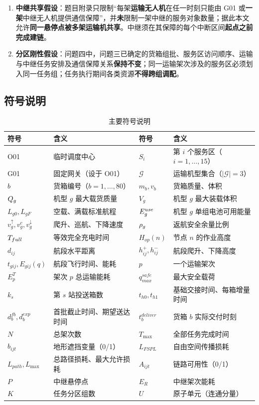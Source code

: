 \begin{enumerate}[label=\textbf{假设 \arabic*}]
	\item \textbf{中继共享假设}：题目附录只限制“每架\textbf{运输无人机}在任一时刻只能由 G01 或\textbf{一架}中继无人机提供通信保障”，并\textbf{未}限制一架中继的服务对象数量；据此本文允许\textbf{同一悬停点被多架运输机共享}。中继须在其保障的每个中断区间\textbf{起点之前完成建链}。
	\item \textbf{分区刚性假设}：问题四中，问题三已确定的货箱组批、服务区访问顺序、运输与中继任务安排及通信保障关系\textbf{保持不变}；同一运输架次涉及的服务区必须划入同一任务组；任务执行期间各类资源\textbf{不得跨组调配}。
\end{enumerate}

\subsection{符号说明}

\begin{table}[htbp]
	\caption{主要符号说明}
	\label{tab:symbol}
	\centering
	\begin{tabular}{llll}
		\toprule
		符号 & 含义 & 符号 & 含义 \\
		\midrule
		O01 & 临时调度中心 & $S_{i}$ & 第 $i$ 个服务区（$i=1,\dots,15$） \\
		G01 & 固定网关（设于 O01） & $\mathcal{G}$ & 运输机型集合（$|\mathcal{G}|=3$） \\
		$b$ & 货箱编号（$b=1,\dots,80$） & $m_{b},v_{b}$ & 货箱质量、体积 \\
		$Q_{g}$ & 机型 $g$ 最大载货质量 & $V_{g}$ & 机型 $g$ 最大装载体积 \\
		$L_{g0},L_{gF}$ & 空载、满载标准航程 & $E_{g}^{use}$ & 机型 $g$ 单组电池可用能量 \\
		$v_{g}^{\uparrow},v_{g}^{c},v_{g}^{\downarrow}$ & 爬升、巡航、下降速度 & $\rho_{g}$ & 返航安全余量比例 \\
		$T_{full}$ & 等效完全充电时间 & $H_{op}(n)$ & 节点 $n$ 的作业高度 \\
		$d_{ij}$ & 航段水平距离 & $h_{ij}^{+},h_{ij}^{-}$ & 航段爬升、下降高度 \\
		$t_{gij},E_{gij}(q)$ & 航段飞行时间、能耗 & $p$ & 一个运输架次 \\
		$E_{p}^{T}$ & 架次 $p$ 总运输能耗 & $q_{max}^{safe}$ & 最大安全载荷 \\
		$k_{s}$ & 第 $s$ 站投送箱数 & $t_{h0},t_{h1}$ & 基础交接时间、每箱增量时间 \\
		$d_{b}^{fb},d_{b}^{exp}$ & 首批截止时间、期望送达时间 & $t_{b}^{deliver}$ & 货箱 $b$ 实际交付时刻 \\
		$N$ & 总架次数 & $T_{\max}$ & 全部任务完成时间 \\
		$b_{ijt}$ & 地形遮挡变量（0/1） & $L_{FSPL}$ & 自由空间传播损耗 \\
		$L_{path},L_{\max}$ & 总路径损耗、最大允许损耗 & $A_{ijt}$ & 链路可用性（0/1） \\
		$P$ & 中继悬停点 & $E_{R}$ & 中继架次能耗 \\
		$K$ & 任务分区组数 & $U$ & 原子单元（连通分量） \\
		\bottomrule
	\end{tabular}
\end{table}

